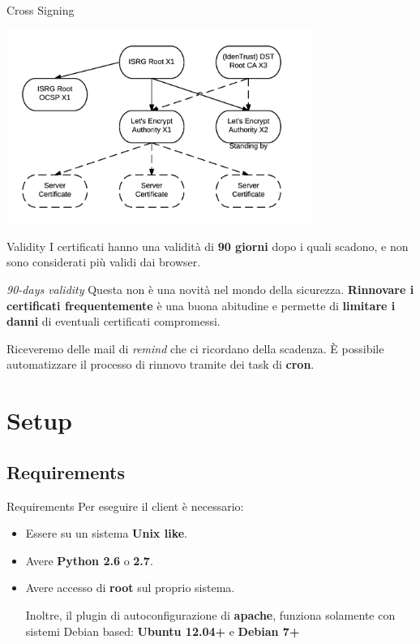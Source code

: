 \documentclass[xcolor=svgnames,11pt]{beamer}
\begin{document}
\begin{frame}{Cross Signing}
\begin{center}
\includegraphics[width=10cm]{img/certs.png}
\end{center}
\end{frame}

\begin{frame}{Validity}
I certificati hanno una validità di \textbf{90 giorni} dopo i quali scadono, e non sono
considerati più validi dai browser.

\medskip\pause

\begin{block}{\emph{90-days validity}}
Questa non è una novità nel mondo della sicurezza. \textbf{Rinnovare i certificati frequentemente}
è una buona abitudine e permette di \textbf{limitare i danni} di eventuali certificati compromessi.
\end{block}

\medskip\pause
Riceveremo delle mail di \emph{remind} che ci ricordano della scadenza.
È possibile automatizzare il processo di rinnovo tramite dei task di \textbf{cron}.
\end{frame}


\section{Setup}
\subsection{Requirements}
\begin{frame}{Requirements}
Per eseguire il client è necessario:
\begin{itemize}
  \item Essere su un sistema \textbf{Unix like}.
  \item Avere \textbf{Python 2.6} o \textbf{2.7}.
  \item Avere accesso di \textbf{root} sul proprio sistema.

\medskip\pause

Inoltre, il plugin di autoconfigurazione di \textbf{apache}, funziona solamente con
sistemi Debian based: \textbf{Ubuntu 12.04+} e \textbf{Debian 7+}

\end{itemize}
\end{frame}
\end{document}
